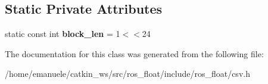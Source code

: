 \subsection*{Static Private Attributes}
\begin{DoxyCompactItemize}
\item 
\mbox{\label{classio_1_1LineReader_a04db9ad3b956347b48136dbe5751469d}} 
static const int {\bfseries block\+\_\+len} = 1$<$$<$24
\end{DoxyCompactItemize}


The documentation for this class was generated from the following file\+:\begin{DoxyCompactItemize}
\item 
/home/emanuele/catkin\+\_\+ws/src/ros\+\_\+float/include/ros\+\_\+float/csv.\+h\end{DoxyCompactItemize}
